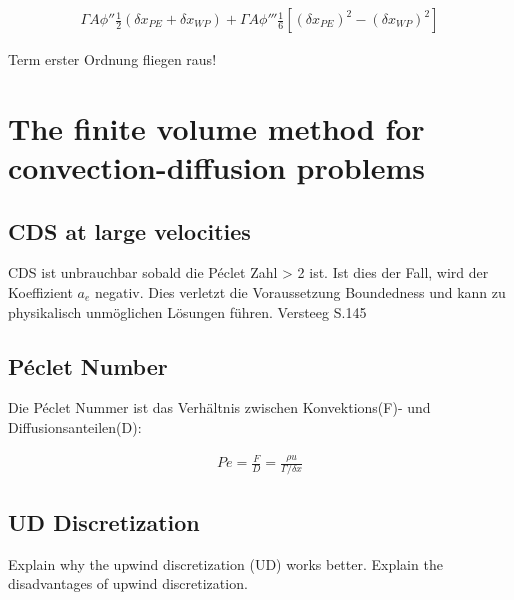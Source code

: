 \documentclass[a4paper]{scrartcl}
\begin{document}
\begin{align}
\boxed{\Gamma A \phi'' \frac{1}{2} \left(\delta x_{PE} + \delta x_{WP}\right)+
\Gamma A \phi''' \frac{1}{6}
\left[\left(\delta x_{PE}\right)^2 - \left(\delta x_{WP}\right)^2 \right]}
\end{align}


Term erster Ordnung fliegen raus!
\section{The finite volume method for convection-diffusion problems}
\subsection{CDS at large velocities}
CDS ist unbrauchbar sobald die Péclet Zahl > 2 ist. Ist dies der Fall, wird der
Koeffizient $a_e$ negativ. Dies verletzt die Voraussetzung Boundedness und kann
zu physikalisch unmöglichen Lösungen führen. Versteeg S.145
\subsection{Péclet Number}
Die Péclet Nummer ist das Verhältnis zwischen Konvektions(F)- und
Diffusionsanteilen(D):

\begin{align}
Pe=\frac{F}{D} = \frac{\rho u}{\Gamma / \delta x}
\end{align}
\subsection{UD Discretization}
Explain why the upwind discretization (UD) works better. Explain the disadvantages of upwind discretization.
\end{document}
